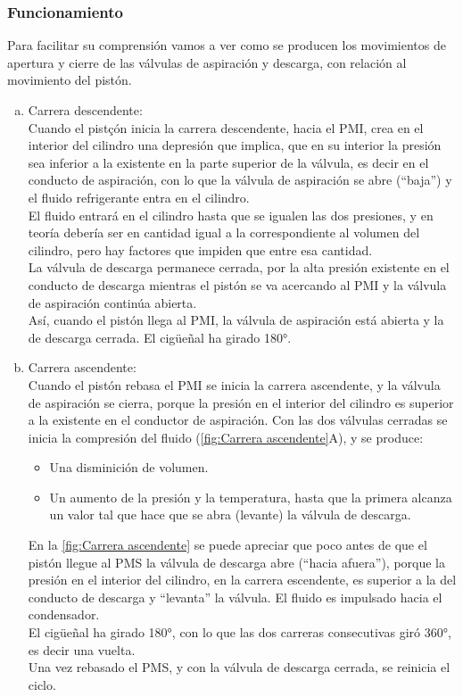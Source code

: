 \subsubsection{Funcionamiento}
Para facilitar su comprensi\'on vamos a ver como se producen los movimientos de apertura y cierre de las v\'alvulas de aspiraci\'on y descarga, con relaci\'on al movimiento del pist\'on.
\begin{enumerate}[a.]
	\item Carrera descendente:\\ Cuando el pistçón inicia la carrera descendente, hacia el PMI, crea en el interior del cilindro una depresi\'on que implica, que en su interior la presi\'on sea inferior a la existente en la parte superior de la v\'alvula, es decir en el conducto de aspiraci\'on, con lo que la v\'alvula de aspiraci\'on se abre (``baja'') y el fluido refrigerante entra en el cilindro.\\ El fluido entrar\'a en el cilindro hasta que se igualen las dos presiones, y en teor\'ia deber\'ia ser en cantidad igual a la correspondiente al volumen del cilindro, pero hay factores que impiden que entre esa cantidad.\\ La v\'alvula de descarga permanece cerrada, por la alta presi\'on existente en el conducto de descarga mientras el pist\'on se va acercando al PMI y la v\'alvula de aspiraci\'on contin\'ua abierta.\\ As\'i, cuando el pist\'on llega al PMI, la v\'alvula de aspiraci\'on est\'a abierta y la de descarga cerrada. El cig\"ue\~{n}al ha girado 180°.
	\item Carrera ascendente:\\ Cuando el pist\'on rebasa el PMI se inicia la carrera ascendente, y la v\'alvula de aspiraci\'on se cierra, porque la presi\'on en el interior del cilindro es superior a la existente en el conductor de aspiraci\'on. Con las dos v\'alvulas cerradas se inicia la compresi\'on del fluido (\autoref{fig:Carrera ascendente}A), y se produce:
	\begin{itemize}
		\item Una disminici\'on de volumen.
		\item Un aumento de la presi\'on y la temperatura, hasta que la primera alcanza un valor tal que hace que se abra (levante) la v\'alvula de descarga.
	\end{itemize}
	En la \autoref{fig:Carrera ascendente} se puede apreciar que poco antes de que el pist\'on llegue al PMS la v\'alvula de descarga abre (``hacia afuera''), porque la presi\'on en el interior del cilindro, en la carrera escendente, es superior a la del conducto de descarga y ``levanta'' la v\'alvula. El fluido es impulsado hacia el condensador.\\
	El cig\"ue\~{n}al ha girado 180°, con lo que las dos carreras consecutivas gir\'o 360°, es decir una vuelta.\\ Una vez rebasado el PMS, y con la v\'alvula de descarga cerrada, se reinicia el ciclo.
\end{enumerate}
